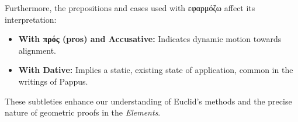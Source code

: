 Furthermore, the prepositions and cases used with \textgreek{εφαρμόζω} affect its interpretation:
\begin{itemize}
\item \textbf{With \textgreek{πρός} (pros) and Accusative:} Indicates dynamic motion towards alignment.
\item \textbf{With Dative:} Implies a static, existing state of application, common in the writings of Pappus.
\end{itemize}

These subtleties enhance our understanding of Euclid's methods and the precise nature of geometric proofs in the \textit{Elements}.

\clearpage
